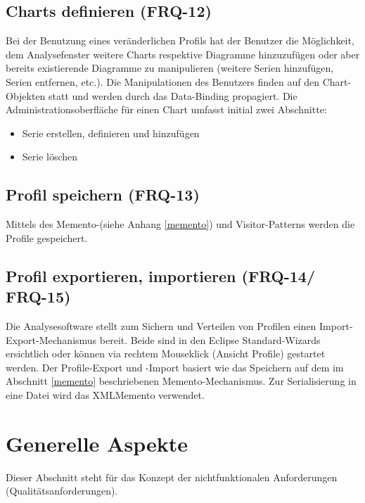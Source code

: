 \section{Charts definieren (FRQ-12)}
Bei der Benutzung eines veränderlichen Profils hat der Benutzer die Möglichkeit, dem Analysefenster weitere Charts respektive Diagramme hinzuzufügen oder aber bereits existierende Diagramme zu manipulieren (weitere Serien hinzufügen, Serien entfernen, etc.). Die Manipulationen des Benutzers finden auf den Chart-Objekten statt und werden durch das Data-Binding propagiert. Die Administrationsoberfläche für einen Chart umfasst initial zwei Abschnitte:
\begin{itemize}
	\item Serie erstellen, definieren und hinzufügen
	 \item Serie löschen
\end{itemize}

\section{Profil speichern (FRQ-13)}
Mittels des Memento-(siehe Anhang \ref{memento}) und Visitor-Patterns\cite[S. 331]{gamma1995design} werden die Profile gespeichert.

\section{Profil exportieren, importieren (FRQ-14/ FRQ-15)}
Die Analysesoftware stellt zum Sichern und Verteilen von Profilen einen Import-Export-Mechanismus bereit. Beide sind in den Eclipse Standard-Wizards ersichtlich oder können via rechtem Mouseklick (Ansicht Profile) gestartet werden. Der Profile-Export und -Import basiert wie das Speichern auf dem im Abschnitt \ref{memento} beschriebenen Memento-Mechanismus. Zur Serialisierung in eine Datei wird das XMLMemento verwendet. 

\chapter{Generelle Aspekte}
Dieser Abschnitt steht für das Konzept der nichtfunktionalen Anforderungen (Qualitätsanforderungen). 
